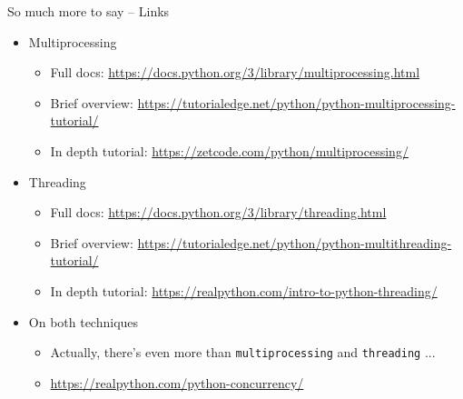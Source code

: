 
\begin{frame}[fragile]{So much more to say -- Links}
%
\begin{itemize}
\item Multiprocessing
	\begin{itemize}
	\item Full docs: \url{https://docs.python.org/3/library/multiprocessing.html}
	\item Brief overview: \url{https://tutorialedge.net/python/python-multiprocessing-tutorial/}
	\item In depth tutorial: \url{https://zetcode.com/python/multiprocessing/}
	\end{itemize}
\item Threading
	\begin{itemize}
	\item Full docs: \url{https://docs.python.org/3/library/threading.html}
	\item Brief overview: \url{https://tutorialedge.net/python/python-multithreading-tutorial/}
	\item In depth tutorial: \url{https://realpython.com/intro-to-python-threading/}
	\end{itemize}
\item On both techniques
	\begin{itemize}
	\item Actually, there's even more than \texttt{multiprocessing} and \texttt{threading} ...
	\item \url{https://realpython.com/python-concurrency/}
	\end{itemize}
\end{itemize}
%
\end{frame}